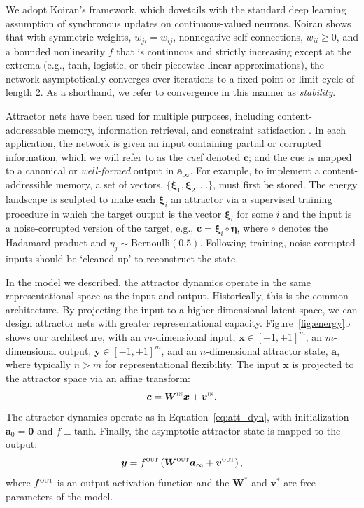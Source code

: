 \documentclass{article}
\newcommand{\Win}{{\ensuremath{\bm{W}^{\textsc{in}}}}}
\newcommand{\vin}{{\ensuremath{\bm{v}^{\textsc{in}}}}}
\newcommand{\Wout}{{\ensuremath{\bm{W}^{\textsc{out}}}}}
\newcommand{\vout}{{\ensuremath{\bm{v}^{\textsc{out}}}}}
\newcommand{\fout}{{\ensuremath{f^{\textsc{out}}}}}
\newcommand{\cue}{{\ensuremath{\bm{c}}}}
\begin{document}
We adopt Koiran's \citeyear{Koiran1994} framework, which dovetails with the
standard deep learning assumption of synchronous updates on continuous-valued
neurons. Koiran shows that with symmetric weights, $w_{ji} = w_{ij}$,
nonnegative self connections, $w_{ii} \ge 0$, and a bounded nonlinearity $f$
that is continuous and strictly increasing except at the extrema (e.g., tanh,
logistic, or their piecewise linear approximations), the network asymptotically
converges over iterations to a fixed point or limit cycle of length 2. As a 
shorthand, we refer to convergence in this manner as \emph{stability}.

Attractor nets have been used for multiple purposes, including
content-addressable memory, information retrieval, and constraint satisfaction
\citep{Mozer2009,Siegelmann2008}. In each application, the network is 
given an input containing partial or corrupted information, which we will refer
to as the \emph{cue}f denoted $\cue$; and the cue is mapped to
a canonical or \emph{well-formed} output in $\bm{a}_\infty$.
For example, to implement a content-addressible memory, a set of vectors, $\{
\bm{\xi}_1,\bm{\xi}_2,\ldots \}$, must first be stored. The energy landscape is
sculpted to make each $\bm{\xi}_i$ an attractor via a supervised training
procedure in which the target output is the vector $\bm{\xi}_i$ for some $i$
and the input is a noise-corrupted version of the target, e.g., $\cue =
\bm{\xi}_i \circ \bm{\eta}$, where $\circ$ denotes the Hadamard product and
$\eta_j \sim \mathrm{Bernoulli}(0.5)$. Following training, noise-corrupted
inputs should be `cleaned up' to reconstruct the state.

In the model we described, the attractor dynamics operate in the same
representational space as the input and output. Historically, this is the
common architecture. By projecting the input to a higher dimensional latent
space, we can design attractor nets with greater representational capacity.
Figure~\ref{fig:energy}b shows our architecture, with an
$m$-dimensional input, $\bm{x} \in [-1, +1]^m$, an $m$-dimensional output,
$\bm{y} \in [-1, +1]^m$, and an $n$-dimensional attractor state, $\bm{a}$,
where typically $n > m$ for representational flexibility.  The input $\bm{x}$
is projected to the attractor space via an affine transform:
\begin{equation}
\cue = \Win \bm{x} + \vin .  
\label{eq:cue} 
\end{equation} 
The attractor dynamics operate as in Equation~\ref{eq:att_dyn}, with
initialization $\bm{a}_0 = \bm{0}$ and $f \equiv \mathrm{tanh}$.  Finally, the
asymptotic attractor state is mapped to the output: 
\begin{equation} 
\bm{y} = \fout \left( \Wout \bm{a}_{\infty} + \vout \right) , 
\end{equation} 
where $\fout$ is an output activation function and the $\bm{W}^*$ and
$\bm{v}^*$ are free parameters of the model.
\end{document}
